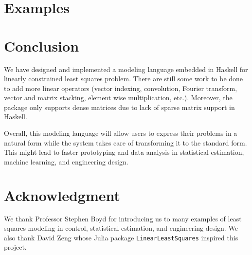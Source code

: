\documentclass[12pt]{article}
\begin{document}
\section{Examples}

\section{Conclusion}

We have designed and implemented a modeling language embedded in Haskell for
linearly constrained least squares problem.
There are still some work to be done to add more linear operators (vector
indexing, convolution, Fourier transform, vector and matrix stacking, element
wise multiplication, etc.).
Moreover, the package only supports dense matrices due to lack of sparse matrix
support in Haskell.

Overall, this modeling language will allow users to express their problems in a
natural form while the system takes care of transforming it to the standard
form.
This might lead to faster prototyping and data analysis in statistical
estimation, machine learning, and engineering design.

\section*{Acknowledgment}

We thank Professor Stephen Boyd for introducing us to many examples of least
squares modeling in control, statistical estimation, and engineering design.
We also thank David Zeng whose Julia package \verb|LinearLeastSquares|
\cite{zeng2014linearleastsquares} inspired this project.


\end{document}
